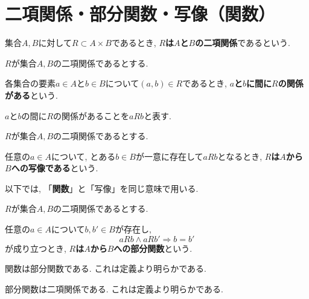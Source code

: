 \documentclass{jsbook}
\theoremstyle{plain}
\begin{document}
\section{二項関係・部分関数・写像（関数）}
\begin{Def}
集合$A,B$に対して$R\subset A\times B$であるとき, {\bf $R$は$A$と$B$の二項関係}であるという.
\end{Def}
\begin{Def}
$R$が集合$A,B$の二項関係であるとする.

各集合の要素$a\in A$と$b\in B$について$(a,b)\in R$であるとき,
{\bf $a$と$b$に間に$R$の関係がある}という.
\end{Def}
\begin{Notation}
$a$と$b$の間に$R$の関係があることを$aRb$と表す.
\end{Notation}
\begin{Def}
$R$が集合$A,B$の二項関係であるとする.

任意の$a\in A$について, とある$b\in B$が一意に存在して$aRb$となるとき,
{\bf $R$は$A$から$B$への写像である}という.
\end{Def}
\begin{caution}
以下では, 「{\bf 関数}」と「写像」を同じ意味で用いる.
\end{caution}
\begin{Def}
$R$が集合$A,B$の二項関係であるとする.

任意の$a\in A$について$b,b'\in B$が存在し,
\[
aRb\land aRb'\Rightarrow b=b'
\]
が成り立つとき, {\bf $R$は$A$から$B$への部分関数}という.
\end{Def}
\begin{Prop}
関数は部分関数である. これは定義より明らかである.
\end{Prop}
\begin{Prop}
部分関数は二項関係である. これは定義より明らかである.
\end{Prop}
\end{document}
